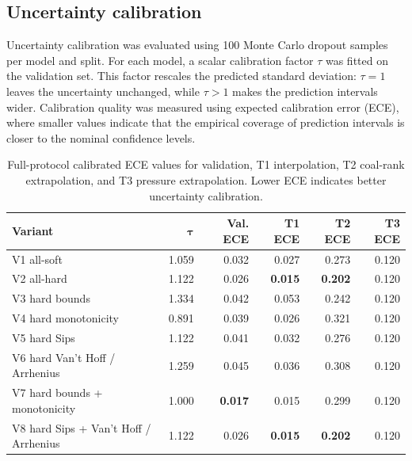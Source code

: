 \documentclass[11pt]{article}
\begin{document}
\subsection{Uncertainty calibration}

Uncertainty calibration was evaluated using 100 Monte Carlo dropout samples per
model and split. For each model, a scalar calibration factor \(\tau\) was fitted
on the validation set. This factor rescales the predicted standard deviation:
\(\tau=1\) leaves the uncertainty unchanged, while \(\tau>1\) makes the
prediction intervals wider. Calibration quality was measured using expected
calibration error (ECE), where smaller values indicate that the empirical
coverage of prediction intervals is closer to the nominal confidence levels.

\begin{table}[htbp]
    \centering
    \small
    \begin{tabular}{lrrrrr}
        \toprule
        \textbf{Variant}                      & \(\boldsymbol{\tau}\) & \textbf{Val. ECE}
                                              & \textbf{T1 ECE}       & \textbf{T2 ECE}   & \textbf{T3 ECE}                          \\
        \midrule
        V1 all-soft                           & 1.059                 & 0.032             & 0.027           & 0.273          & 0.120 \\
        V2 all-hard                           & 1.122                 & 0.026             & \textbf{0.015}  & \textbf{0.202} & 0.120 \\
        V3 hard bounds                        & 1.334                 & 0.042             & 0.053           & 0.242          & 0.120 \\
        V4 hard monotonicity                  & 0.891                 & 0.039             & 0.026           & 0.321          & 0.120 \\
        V5 hard Sips                          & 1.122                 & 0.041             & 0.032           & 0.276          & 0.120 \\
        V6 hard Van't Hoff / Arrhenius        & 1.259                 & 0.045             & 0.036           & 0.308          & 0.120 \\
        V7 hard bounds + monotonicity         & 1.000                 & \textbf{0.017}    & 0.015           & 0.299          & 0.120 \\
        V8 hard Sips + Van't Hoff / Arrhenius & 1.122                 & 0.026             & \textbf{0.015}  & \textbf{0.202} & 0.120 \\
        \bottomrule
    \end{tabular}
    \caption{Full-protocol calibrated ECE values for validation, T1 interpolation,
        T2 coal-rank extrapolation, and T3 pressure extrapolation. Lower ECE
        indicates better uncertainty calibration.}
    \label{tab:uq-calibration}
\end{table}
\end{document}
